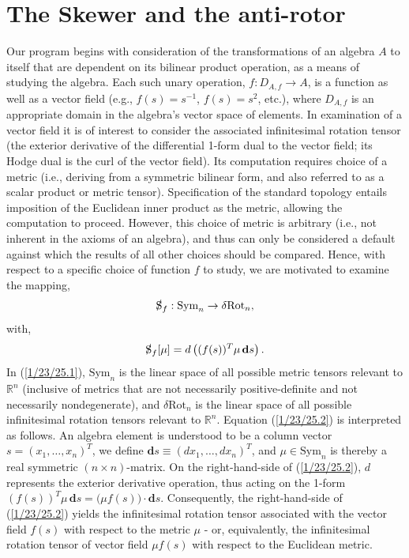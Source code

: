 \documentclass{amsart}
\theoremstyle{definition}
\numberwithin{theorem}{section}
\numberwithin{equation}{section}
\begin{document}
\section{The Skewer and the anti-rotor} Our program begins with consideration of the transformations of an algebra $A$ to itself that are dependent on its bilinear product operation, as a means of studying the algebra.   Each such unary operation, $f:D_{A,f}\rightarrow A$, is a function as well as a vector field (e.g., $f(s)=s^{-1}$, $f(s)=s^2$, etc.), where $D_{A,f}$ is an appropriate domain in the algebra's vector space of elements.  In examination of a vector field it is of interest to consider the associated infinitesimal rotation tensor (the exterior derivative of the differential 1-form dual to the vector field; its Hodge dual is the curl of the vector field).  Its computation requires choice of a metric (i.e., deriving from a symmetric bilinear form, and also referred to as a scalar product or metric tensor).  Specification of the standard topology entails imposition of the Euclidean inner product as the metric, allowing the computation to proceed.  However, this choice of metric is arbitrary (i.e., not inherent in the axioms of an algebra), and thus can only be considered a default against which the results of all other choices should be compared.  Hence, with respect to a specific choice of function $f$ to study, we are motivated to examine the mapping, \enlargethispage{1cm}  \begin{equation}\label{1/23/25.1} \slashed{\text{S}}_f: \text{Sym}_n \rightarrow \delta\text{Rot}_n,\end{equation}  
with, \begin{equation}\label{1/23/25.2} \slashed{\text{S}}_f[\mu] = d\left((f(s))^T \mu \,\mathbf{d}s\right).  \end{equation}
In (\ref{1/23/25.1}), $\text{Sym}_n$ is the linear space of all possible metric tensors relevant to $\mathbb{R}^n$ (inclusive of metrics that are not necessarily positive-definite and not necessarily nondegenerate), and $\delta\text{Rot}_n$ is the linear space of all possible infinitesimal rotation tensors relevant to $\mathbb{R}^n$.  Equation (\ref{1/23/25.2}) is interpreted as follows.  An algebra element is understood to be a column vector $s=(x_1,\dots,x_n)^T$, we define $\mathbf{d}s \equiv (dx_1,\dots,dx_n)^T$, and $\mu\in \text{Sym}_n$ is thereby a real symmetric $(n\times n)$-matrix.  On the right-hand-side of (\ref{1/23/25.2}), $d$ represents the exterior derivative operation, thus acting on the 1-form $(f(s))^T \mu \,\mathbf{d}s = \big(\mu f(s)\big)\cdot\mathbf{d}s$.   Consequently, the right-hand-side of (\ref{1/23/25.2}) yields the infinitesimal rotation tensor associated with the vector field $f(s)$ with respect to the metric $\mu$ - or, equivalently, the infinitesimal rotation tensor of vector field $\mu f(s)$ with respect to the Euclidean metric.
\end{document}
